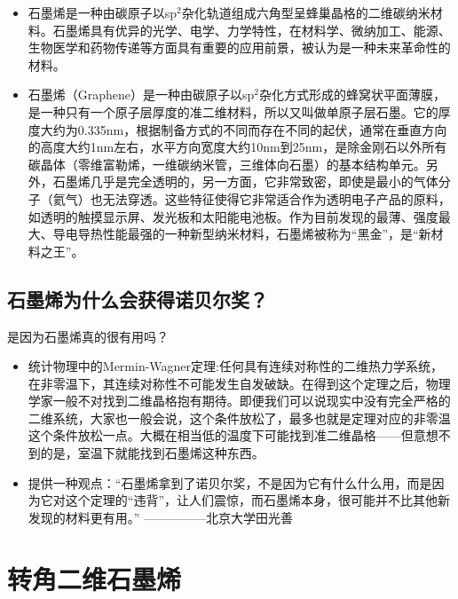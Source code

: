 \documentclass{beamer}
\begin{document}
\begin{frame}
    \begin{itemize}
        \item 石墨烯是一种由碳原子以sp$^2$杂化轨道组成六角型呈蜂巢晶格的二维碳纳米材料。石墨烯具有优异的光学、电学、力学特性，在材料学、微纳加工、能源、生物医学和药物传递等方面具有重要的应用前景，被认为是一种未来革命性的材料。
        \item 石墨烯（Graphene）是一种由碳原子以sp$^2$杂化方式形成的蜂窝状平面薄膜，是一种只有一个原子层厚度的准二维材料，所以又叫做单原子层石墨。它的厚度大约为0.335nm，根据制备方式的不同而存在不同的起伏，通常在垂直方向的高度大约1nm左右，水平方向宽度大约10nm到25nm，是除金刚石以外所有碳晶体（零维富勒烯，一维碳纳米管，三维体向石墨）的基本结构单元。另外，石墨烯几乎是完全透明的，另一方面，它非常致密，即使是最小的气体分子（氦气）也无法穿透。这些特征使得它非常适合作为透明电子产品的原料，如透明的触摸显示屏、发光板和太阳能电池板。作为目前发现的最薄、强度最大、导电导热性能最强的一种新型纳米材料，石墨烯被称为“黑金”，是“新材料之王”。
    \end{itemize}
\end{frame}

\subsection{石墨烯为什么会获得诺贝尔奖？}
\begin{frame}{是因为石墨烯真的很有用吗？}
    \begin{itemize}
        \item 统计物理中的Mermin-Wagner定理:任何具有连续对称性的二维热力学系统，在非零温下，其连续对称性不可能发生自发破缺。在得到这个定理之后，物理学家一般不对找到二维晶格抱有期待。即便我们可以说现实中没有完全严格的二维系统，大家也一般会说，这个条件放松了，最多也就是定理对应的非零温这个条件放松一点。大概在相当低的温度下可能找到准二维晶格——但意想不到的是，室温下就能找到石墨烯这种东西。
        \item 提供一种观点：“石墨烯拿到了诺贝尔奖，不是因为它有什么什么用，而是因为它对这个定理的“违背”，让人们震惊，而石墨烯本身，很可能并不比其他新发现的材料更有用。” —————北京大学田光善

    \end{itemize}
\end{frame}

\section{转角二维石墨烯}
\end{document}
